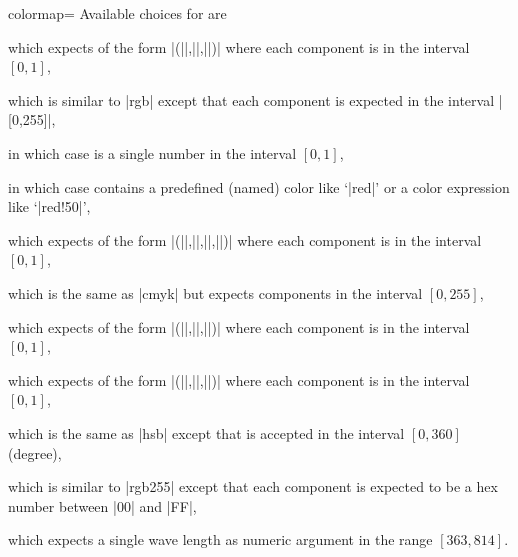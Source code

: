 \begin{pgfplotskey}{colormap=}
Available choices for  are
\begin{description}
\item {} which expects  of the form |(||,||,||)| where each component is in the interval $[0,1]$,
\item {} which is similar to |rgb| except that each component is expected in the interval |[0,255]|,
\item {} in which case  is a single number in the interval $[0,1]$,
\item {} in which case  contains a predefined (named) color like `|red|' or a color expression like `|red!50|',
\item {} which expects  of the form |(||,||,||,||)| where each component is in the interval $[0,1]$,
\item {} which is the same as |cmyk| but expects components in the interval $[0,255]$,
\item {} which expects  of the form |(||,||,||)| where each component is in the interval $[0,1]$,
\item {} which expects  of the form |(||,||,||)| where each component is in the interval $[0,1]$,
\item {} which is the same as |hsb| except that  is accepted in the interval $[0,360]$ (degree),
\item {} which is similar to |rgb255| except that each component is expected to be a hex number between |00| and |FF|,
\item {} which expects a single wave length as numeric argument in the range $[363,814]$.
\end{description}

\begin{codeexample}[]
\end{codeexample}


\end{pgfplotskey}
